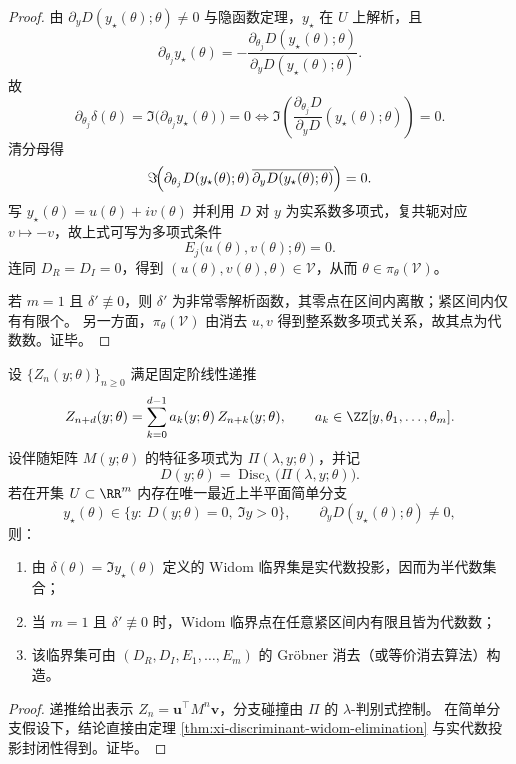 \begin{proof}
由 \(\partial_y D(y_\star(\theta);\theta)\neq 0\) 与隐函数定理，\(y_\star\) 在 \(U\) 上解析，且
\[
\partial_{\theta_j}y_\star(\theta)=
-\frac{\partial_{\theta_j}D(y_\star(\theta);\theta)}
{\partial_y D(y_\star(\theta);\theta)}.
\]
故
\[
\partial_{\theta_j}\delta(\theta)=
\Im\bigl(\partial_{\theta_j}y_\star(\theta)\bigr)=0
\iff
\Im\!\left(
\frac{\partial_{\theta_j}D}{\partial_y D}(y_\star(\theta);\theta)
\right)=0.
\]
清分母得
\[
\Im\!\Bigl(
\partial_{\theta_j}D(y_\star(\theta);\theta)\,
\overline{\partial_y D(y_\star(\theta);\theta)}
\Bigr)=0.
\]
写 \(y_\star(\theta)=u(\theta)+iv(\theta)\) 并利用 \(D\) 对 \(y\) 为实系数多项式，复共轭对应 \(v\mapsto -v\)，故上式可写为多项式条件
\[
E_j\bigl(u(\theta),v(\theta);\theta\bigr)=0.
\]
连同 \(D_R=D_I=0\)，得到
\(
(u(\theta),v(\theta),\theta)\in\mathcal V
\)，从而
\(
\theta\in\pi_\theta(\mathcal V)
\)。

若 \(m=1\) 且 \(\delta'\not\equiv 0\)，则 \(\delta'\) 为非常零解析函数，其零点在区间内离散；紧区间内仅有有限个。
另一方面，\(\pi_\theta(\mathcal V)\) 由消去 \(u,v\) 得到整系数多项式关系，故其点为代数数。证毕。
\end{proof}

\begin{corollary}\label{cor:xi-widom-semialgebraic-for-fixed-order-recurrence}
设 \(\{Z_n(y;\theta)\}_{n\ge 0}\) 满足固定阶线性递推
\[
Z_{n+d}(y;\theta)=\sum_{k=0}^{d-1} a_k(y;\theta)\,Z_{n+k}(y;\theta),
\qquad
a_k\in \ZZ[y,\theta_1,\dots,\theta_m].
\]
设伴随矩阵 \(M(y;\theta)\) 的特征多项式为 \(\Pi(\lambda,y;\theta)\)，并记
\[
D(y;\theta)=\operatorname{Disc}_{\lambda}\!\bigl(\Pi(\lambda,y;\theta)\bigr).
\]
若在开集 \(U\subset\RR^m\) 内存在唯一最近上半平面简单分支
\[
y_\star(\theta)\in\{y:\ D(y;\theta)=0,\ \Im y>0\},
\qquad
\partial_y D(y_\star(\theta);\theta)\neq 0,
\]
则：
\begin{enumerate}
  \item 由 \(\delta(\theta)=\Im y_\star(\theta)\) 定义的 Widom 临界集是实代数投影，因而为半代数集合；
  \item 当 \(m=1\) 且 \(\delta'\not\equiv 0\) 时，Widom 临界点在任意紧区间内有限且皆为代数数；
  \item 该临界集可由 \((D_R,D_I,E_1,\dots,E_m)\) 的 Gröbner 消去（或等价消去算法）构造。
\end{enumerate}
\end{corollary}
\begin{proof}
递推给出表示 \(Z_n=\mathbf u^\top M^n\mathbf v\)，分支碰撞由 \(\Pi\) 的 \(\lambda\)-判别式控制。
在简单分支假设下，结论直接由定理 \ref{thm:xi-discriminant-widom-elimination} 与实代数投影封闭性得到。证毕。
\end{proof}

